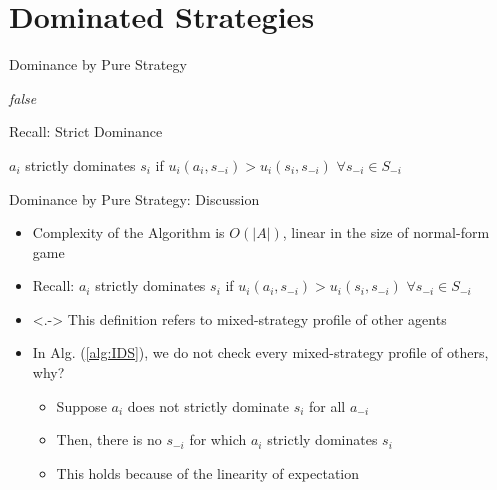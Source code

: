 \documentclass[11pt,aspectratio=169,handout]{beamer}
\begin{document}
 \section{Dominated Strategies}
  \begin{frame}{Dominance by Pure Strategy}
   \begin{algorithm*}[H]
    \Return \textit{false}\;
   \label{alg:IDS}
   \caption{Determine whether $s_i$ is strictly dominated by any pure strategy}
   \end{algorithm*}
  \end{frame}
  
  \begin{frame}{Recall: Strict Dominance}
   \begin{center}
    $a_i$ \alert{strictly dominates} $s_i$ if $u_i(a_i, s_{-i}) > u_i(s_i,s_{-i})$ $\forall s_{-i} \in S_{-i}$
   \end{center}
  \end{frame}
    
  \begin{frame}{Dominance by Pure Strategy: Discussion}
   \begin{itemize}[<+->]
   \setlength{\itemsep}{1.2em}
    \item Complexity of the Algorithm is $O(\vert A\vert)$, linear in the size of normal-form game
    \item Recall: $a_i$ \alert{strictly dominates} $s_i$ if $u_i(a_i, s_{-i}) > u_i(s_i,s_{-i})$ $\forall s_{-i} \in S_{-i}$
    \item<.-> This definition refers to mixed-strategy profile of other agents
    \item In Alg. (\ref{alg:IDS}), we do not check every mixed-strategy profile of others, why?
    \begin{itemize}
    \setlength{\itemsep}{0.8em}
     \item Suppose $a_i$ does not strictly dominate $s_i$ for all $a_{-i}$
     \item Then, there is no $s_{-i}$ for which $a_i$ strictly dominates $s_i$
     \item This holds because of the linearity of expectation
    \end{itemize}
   \end{itemize}
  \end{frame}
  
\end{document}
